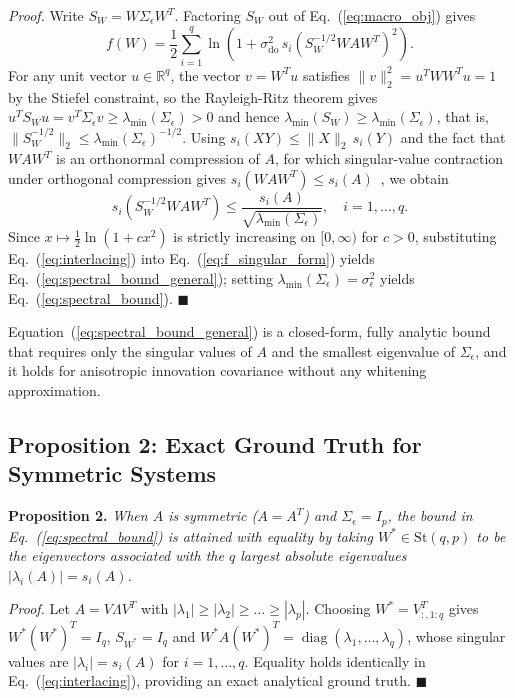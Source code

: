 \documentclass[preprint,12pt]{elsarticle}
\begin{document}
\emph{Proof.} Write $S_W = W \Sigma_\epsilon W^T$. Factoring $S_W$ out of Eq.~(\ref{eq:macro_obj}) gives
\begin{equation}
f(W) = \frac{1}{2} \sum_{i=1}^q \ln\left( 1 + \sigma_{\mathrm{do}}^2 \, s_i\!\left( S_W^{-1/2} W A W^T \right)^2 \right).
\label{eq:f_singular_form}
\end{equation}
For any unit vector $u \in \mathbb{R}^q$, the vector $v = W^T u$ satisfies $\|v\|_2^2 = u^T W W^T u = 1$ by the Stiefel constraint, so the Rayleigh-Ritz theorem gives $u^T S_W u = v^T \Sigma_\epsilon v \ge \lambda_{\min}(\Sigma_\epsilon) > 0$ and hence $\lambda_{\min}(S_W) \ge \lambda_{\min}(\Sigma_\epsilon)$, that is, $\| S_W^{-1/2} \|_2 \le \lambda_{\min}(\Sigma_\epsilon)^{-1/2}$. Using $s_i(XY) \le \|X\|_2 \, s_i(Y)$ and the fact that $W A W^T$ is an orthonormal compression of $A$, for which singular-value contraction under orthogonal compression gives $s_i(W A W^T) \le s_i(A)$~\cite{Thompson1972,HornJohnson2013}, we obtain
\begin{equation}
s_i\!\left( S_W^{-1/2} W A W^T \right) \le \frac{s_i(A)}{\sqrt{\lambda_{\min}(\Sigma_\epsilon)}}, \quad i = 1, \dots, q.
\label{eq:interlacing}
\end{equation}
Since $x \mapsto \frac{1}{2}\ln(1 + c x^2)$ is strictly increasing on $[0, \infty)$ for $c > 0$, substituting Eq.~(\ref{eq:interlacing}) into Eq.~(\ref{eq:f_singular_form}) yields Eq.~(\ref{eq:spectral_bound_general}); setting $\lambda_{\min}(\Sigma_\epsilon) = \sigma_\epsilon^2$ yields Eq.~(\ref{eq:spectral_bound}). $\blacksquare$

Equation~(\ref{eq:spectral_bound_general}) is a closed-form, fully analytic bound that requires only the singular values of $A$ and the smallest eigenvalue of $\Sigma_\epsilon$, and it holds for anisotropic innovation covariance without any whitening approximation.

\subsection{Proposition 2: Exact Ground Truth for Symmetric Systems}

\textbf{Proposition 2.} \emph{When $A$ is symmetric ($A = A^T$) and $\Sigma_\epsilon = I_p$, the bound in Eq.~(\ref{eq:spectral_bound}) is attained with equality by taking $W^* \in \mathrm{St}(q, p)$ to be the eigenvectors associated with the $q$ largest absolute eigenvalues $|\lambda_i(A)| = s_i(A)$.}

\emph{Proof.} Let $A = V \Lambda V^T$ with $|\lambda_1| \ge |\lambda_2| \ge \dots \ge |\lambda_p|$. Choosing $W^* = V_{:, 1:q}^T$ gives $W^* (W^*)^T = I_q$, $S_{W^*} = I_q$ and $W^* A (W^*)^T = \operatorname{diag}(\lambda_1, \dots, \lambda_q)$, whose singular values are $|\lambda_i| = s_i(A)$ for $i = 1, \dots, q$. Equality holds identically in Eq.~(\ref{eq:interlacing}), providing an exact analytical ground truth. $\blacksquare$
\end{document}

